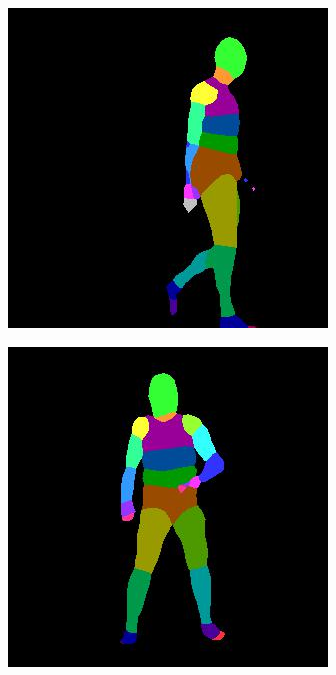 \documentclass{beamer}
\begin{document}
\begin{frame}
\begin{figure}
\begin{subfigure}{.19\textwidth}
\end{subfigure}
\begin{subfigure}{.19\textwidth}
  \centering
  \includegraphics[scale=0.12]{40_02_c0011_19_ice.jpg}
\end{subfigure}
\begin{subfigure}{.189\textwidth}
  \centering
  \includegraphics[scale=0.12]{104_52_c0002_64_ice.jpg}
\end{subfigure}\\


\end{figure}
\end{frame}
\end{document}
